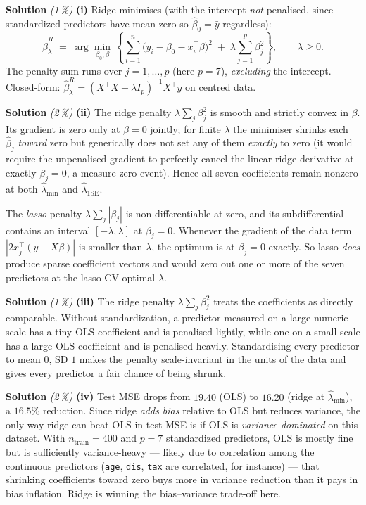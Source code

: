 \documentclass[11pt,a4paper]{article}
\newcommand{\subpoints}[1]{\textit{(#1\,\%)}}
\newcommand{\sol}{\noindent\textbf{Solution}}
\begin{document}
\sol{} \subpoints{1} \textbf{(i)} Ridge minimises (with the intercept \emph{not} penalised, since standardized
predictors have mean zero so $\hat\beta_0 = \bar y$ regardless):
$$\hat\beta^R_\lambda \;=\; \arg\min_{\beta_0,\beta}\,
   \left\{\sum_{i=1}^{n}\bigl(y_i - \beta_0 - x_i^\top\beta\bigr)^2 \;+\; \lambda\sum_{j=1}^{p}\beta_j^2\right\},
   \qquad \lambda\geq 0.$$
The penalty sum runs over $j=1,\dots,p$ (here $p=7$), \emph{excluding} the intercept. Closed-form:
$\hat\beta^R_\lambda = (X^\top X + \lambda I_p)^{-1}X^\top y$ on centred data.

\medskip
\sol{} \subpoints{2} \textbf{(ii)} The ridge penalty $\lambda\sum_j\beta_j^2$ is smooth and strictly convex in
$\beta$. Its gradient is zero only at $\beta=0$ jointly; for finite $\lambda$ the minimiser shrinks each
$\hat\beta_j$ \emph{toward} zero but generically does not set any of them \emph{exactly} to zero (it would
require the unpenalised gradient to perfectly cancel the linear ridge derivative at exactly $\beta_j=0$,
a measure-zero event). Hence all seven coefficients remain nonzero at both $\hat\lambda_{\min}$ and
$\hat\lambda_{1\text{SE}}$.

The \emph{lasso} penalty $\lambda\sum_j|\beta_j|$ is non-differentiable at zero, and its subdifferential
contains an interval $[-\lambda,\lambda]$ at $\beta_j=0$. Whenever the gradient of the data term
$|2x_j^\top(y - X\beta)|$ is smaller than $\lambda$, the optimum is at $\beta_j=0$ exactly. So lasso
\emph{does} produce sparse coefficient vectors and would zero out one or more of the seven predictors at
the lasso CV-optimal $\lambda$.

\medskip
\sol{} \subpoints{1} \textbf{(iii)} The ridge penalty $\lambda\sum_j\beta_j^2$ treats the coefficients as
directly comparable. Without standardization, a predictor measured on a large numeric scale has
a tiny OLS coefficient and is penalised lightly, while one on a small scale has a large OLS coefficient
and is penalised heavily. Standardising every predictor to mean $0$, SD $1$ makes the penalty scale-invariant
in the units of the data and gives every predictor a fair chance of being shrunk.

\medskip
\sol{} \subpoints{2} \textbf{(iv)} Test MSE drops from $19.40$ (OLS) to $16.20$ (ridge at $\hat\lambda_{\min}$),
a $16.5\%$ reduction. Since ridge \emph{adds bias} relative to OLS but reduces variance, the only way ridge
can beat OLS in test MSE is if OLS is \emph{variance-dominated} on this dataset. With $n_\text{train}=400$
and $p=7$ standardized predictors, OLS is mostly fine but is sufficiently variance-heavy ---
likely due to correlation among the continuous predictors (\texttt{age}, \texttt{dis}, \texttt{tax} are
correlated, for instance) --- that shrinking coefficients toward zero buys more in variance reduction than
it pays in bias inflation. Ridge is winning the bias--variance trade-off here.
\end{document}
